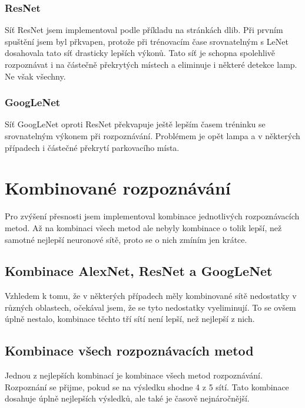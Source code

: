 \documentclass[10pt,a4paper, table]{article}
\begin{document}
\subsubsection{ResNet}
Síť ResNet jsem implementoval podle příkladu na stránkách dlib. Při prvním spuštění jsem byl přkvapen, protože při trénovacím čase srovnatelným s LeNet dosahovala tato síť drasticky lepších výkonů. Tato síť je schopna spolehlivě rozpoznávat i na částečně překrytých místech a eliminuje i některé detekce lamp. Ne však všechny.

\subsubsection{GoogLeNet}
Síť GoogLeNet oproti ResNet překvapuje ještě lepším časem tréninku se srovnatelným výkonem při rozpoznávání. Problémem je opět lampa a v některých případech i částečné překrytí parkovacího místa.

\section{Kombinované rozpoznávání}
Pro zvýšení přesnosti jsem implementoval kombinace jednotlivých rozpoznávacích metod. Až na kombinaci všech metod ale nebyly kombinace o tolik lepší, než samotné nejlepší neuronové sítě, proto se o nich zmíním jen krátce.

\subsection{Kombinace AlexNet, ResNet a GoogLeNet}
Vzhledem k tomu, že v některých případech měly kombinované sítě nedostatky v různých oblastech, očekával jsem, že se tyto nedostatky vyeliminují. To se ovšem úplně nestalo, kombinace těchto tří sítí není lepší, než nejlepší z nich.

\subsection{Kombinace všech rozpoznávacích metod}
Jednou z nejlepších kombinací je kombinace všech metod rozpoznávání. Rozpoznání se přijme, pokud se na výsledku shodne 4 z 5 sítí. Tato kombinace dosahuje úplně nejlepších výsledků, ale také je časově nejnáročnější.

\clearpage
\end{document}
